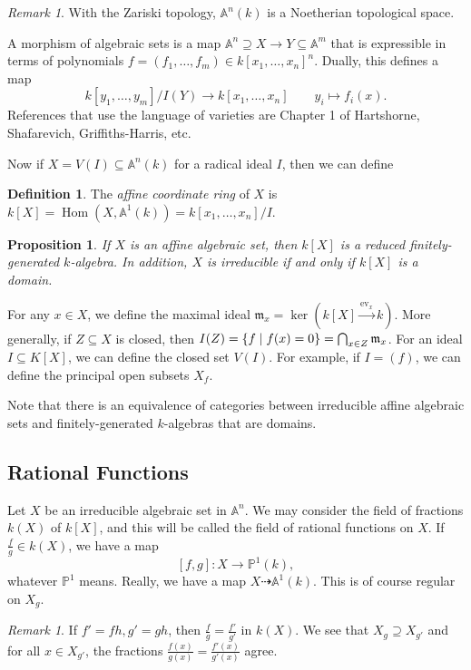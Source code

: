 \documentclass[leqno, openany]{memoir}
\newtheorem{prop}[thm]{Proposition}
\theoremstyle{definition}
\newtheorem{defn}[thm]{Definition}
\theoremstyle{remark}
\newtheorem{rmk}[thm]{Remark}
\theoremstyle{plain}
\theoremstyle{definition}
\theoremstyle{remark}
\newcommand{\A}{\mathbb{A}}
\renewcommand{\P}{\mathbb{P}}
\newcommand{\mf}[1]{\mathfrak{#1}}
\newcommand{\mr}[1]{\mathrm{#1}}
\DeclareMathOperator{\Hom}{Hom}
\begin{document}
\begin{rmk} With the Zariski topology, $\A^n(k)$ is a Noetherian topological
space.  \end{rmk}

A morphism of algebraic sets is a map $\A^n \supseteq X \to Y \subseteq \A^m$
that is expressible in terms of polynomials $f = (f_1, \ldots, f_m) \in {
k[x_1,\ldots, x_n] }^n$. Dually, this defines a map \[ k[y_1, \ldots, y_m]/I(Y)
\to k[x_1, \ldots, x_n] \qquad y_i \mapsto f_i(x). \] References that use the
language of varieties are Chapter 1 of Hartshorne, Shafarevich,
Griffiths-Harris, etc.

Now if $X = V(I) \subseteq \A^n(k)$ for a radical ideal $I$, then we can define
\begin{defn} The \textit{affine coordinate ring} of $X$ is $k[X] = \Hom(X,
\A^1(k)) = k[x_1, \ldots, x_n] / I$.  \end{defn}

\begin{prop} If $X$ is an affine algebraic set, then $k[X]$ is a reduced
finitely-generated $k$-algebra. In addition, $X$ is irreducible if and only if
$k[X]$ is a domain.  \end{prop}

For any $x \in X$, we define the maximal ideal $\mf{m}_x = \ker (k[X]
\xrightarrow{\mr{ev}_x} k)$. More generally, if $Z \subseteq X$ is closed, then
$I(Z) = \qty{f \mid f(x) = 0} = \bigcap_{x \in Z} \mf{m}_x$. For an ideal $I
\subseteq K[X]$, we can define the closed set $V(I)$. For example, if $I =
(f)$, we can define the principal open subsets $X_f$.

Note that there is an equivalence of categories between irreducible affine
algebraic sets and finitely-generated $k$-algebras that are domains.

\subsection{Rational Functions}%

Let $X$ be an irreducible algebraic set in $\A^n$. We may consider the field of
fractions $k(X)$ of $k[X]$, and this will be called the field of rational
functions on $X$. If $\frac{f}{g} \in k(X)$, we have a map \[ [f,g] \colon X
\to \P^1(k), \] whatever $\P^1$ means. Really, we have a map $X \dashrightarrow
\A^1(k)$. This is of course regular on $X_g$.

\begin{rmk} If $f' = fh, g' = gh$, then $\frac{f}{g} = \frac{f'}{g'}$ in
$k(X)$. We see that $X_g \supseteq X_{g'}$ and for all $x \in X_{g'}$, the
fractions $\frac{f(x)}{g(x)} = \frac{f'(x)}{g'(x)}$ agree.  \end{rmk}
\end{document}
